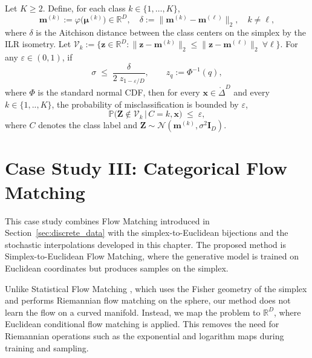 \begin{proposition}\label{prop:sigma_bound}
Let $K\ge 2$.  Define, for each class $k\in\{1,\dots,K\}$,
\[
 \boldsymbol m^{(k)} := \varphi\!\bigl(\boldsymbol\mu^{(k)}\bigr)\in\mathbb R^{D}, \quad \delta := \|\boldsymbol m^{(k)}-\boldsymbol m^{(\ell)}\|_2, \quad k\neq \ell,
\]
where $\delta$ is the Aitchison distance between the class centers on the simplex by the ILR isometry.
Let $\mathcal V_k:=\{\boldsymbol z\in\mathbb R^{D}:\|\boldsymbol z-\boldsymbol m^{(k)}\|_2\le \|\boldsymbol z-\boldsymbol m^{(\ell)}\|_2\ \forall \ell\}$.
For any $\varepsilon\in(0,1)$, if
\begin{equation}\label{eq:sigma_bound}
\sigma \;\le\; \frac{\delta}{2\; z_{1-\varepsilon/D}},
\qquad z_{q}:=\Phi^{-1}(q),
\end{equation}
where $\Phi$ is the standard normal CDF,
then for every $\boldsymbol{x}\in \mathring\Delta^D$ and every $k\in\{1,..,K\}$, the probability of misclassification is bounded by $\varepsilon$,
\[
\mathbb P\!\big(\boldsymbol Z\notin \mathcal V_k \,\big|\, C=k,\boldsymbol{x}\big)\;\le\;\varepsilon,
\]
where $C$ denotes the class label and $\boldsymbol Z\sim\mathcal N(\boldsymbol m^{(k)},\sigma^2\mathbf I_D)$.
\end{proposition}





\section{Case Study III: Categorical Flow Matching}
This case study combines Flow Matching introduced in Section~\ref{sec:discrete_data} with the simplex-to-Euclidean bijections and the stochastic interpolations developed in this chapter. The proposed method is Simplex-to-Euclidean Flow Matching, where the generative model is trained on Euclidean coordinates but produces samples on the simplex.

Unlike Statistical Flow Matching \citep{Cheng2024, Davis2024}, which uses the Fisher geometry of the simplex and performs Riemannian flow matching on the sphere, our method does not learn the flow on a curved manifold. Instead, we map the problem to $\mathbb{R}^D$, where Euclidean conditional flow matching is applied. This removes the need for Riemannian operations such as the exponential and logarithm maps during training and sampling.



